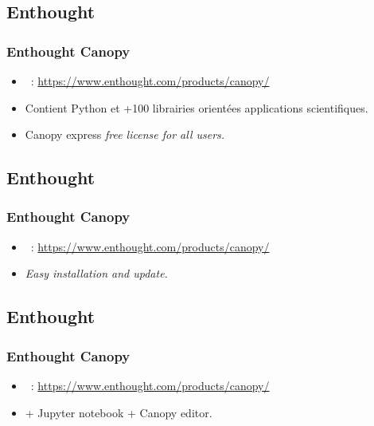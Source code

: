 \subsection{Enthought}
\begin{frame}
\frametitle{Enthought Canopy}
\begin{itemize}
 \item {}\ : \url{https://www.enthought.com/products/canopy/} 
 \item Contient Python et +100 librairies orientées applications scientifiques. 
 \item Canopy express \em{free license for all users}.
\end{itemize}
\end{frame}
\subsection{Enthought}
\begin{frame}
\frametitle{Enthought Canopy}
\begin{itemize}
\footnotesize
 \item {}\ : \url{https://www.enthought.com/products/canopy/} 
 \item \em{Easy installation and update}.
\end{itemize}
\centering{}
\end{frame}
\subsection{Enthought}
\begin{frame}
\frametitle{Enthought Canopy}
\begin{itemize}
\footnotesize
 \item {}\ : \url{https://www.enthought.com/products/canopy/} 
 \item + Jupyter notebook + Canopy editor. 
\end{itemize}
\centering{}
\end{frame}
